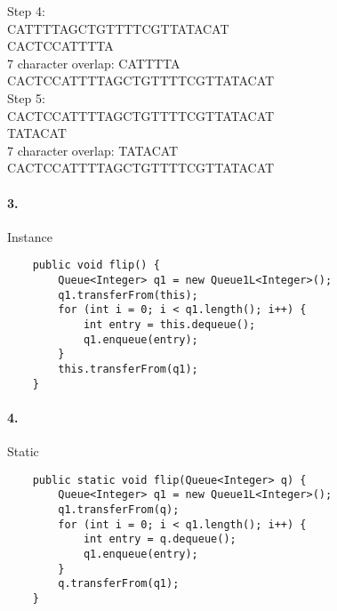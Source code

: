 \documentclass[10pt]{article}
\begin{document}
Step 4: \\
CATTTTAGCTGTTTTCGTTATACAT\\
CACTCCATTTTA\\
7 character overlap: CATTTTA\\
CACTCCATTTTAGCTGTTTTCGTTATACAT\\

Step 5: \\
CACTCCATTTTAGCTGTTTTCGTTATACAT\\
TATACAT\\
7 character overlap: TATACAT\\
 CACTCCATTTTAGCTGTTTTCGTTATACAT\\
 

\paragraph{3. } Instance

\begin{lstlisting}
    public void flip() {
        Queue<Integer> q1 = new Queue1L<Integer>();
        q1.transferFrom(this);
        for (int i = 0; i < q1.length(); i++) {
            int entry = this.dequeue();
            q1.enqueue(entry);
        }
        this.transferFrom(q1);
    }
\end{lstlisting}

\paragraph{4. } Static

\begin{lstlisting}
    public static void flip(Queue<Integer> q) {
        Queue<Integer> q1 = new Queue1L<Integer>();
        q1.transferFrom(q);
        for (int i = 0; i < q1.length(); i++) {
            int entry = q.dequeue();
            q1.enqueue(entry);
        }
        q.transferFrom(q1);
    }
\end{lstlisting}
\end{document}
